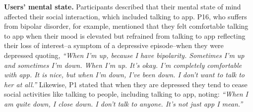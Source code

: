         \textbf{Users' mental state. }
        Participants described that their mental state of mind affected their social interaction, which included talking to \acl{app}.
        P16, who suffers from bipolar disorder, for example, mentioned that they felt comfortable talking to \acl{app} when their mood is elevated but refrained from talking to \acl{app} reflecting their loss of interest--a symptom of a depressive episode--when they were depressed quoting,
                \textit{``When I'm up, because I have bipolarity. Sometimes I'm up and sometimes I'm down. When I'm up. It's okay. I'm completely comfortable with \acl{app}. It is nice, but when I'm down, I've been down. I don't want to talk to her at all.''}
        Likewise, P1 stated that when they are depressed they tend to cease social activities like talking to people, including talking to \acl{app}, noting:
                \textit{``When I am quite down, I close down. I don’t talk to anyone. It’s not just \acl{app} I mean.'' 
                }
